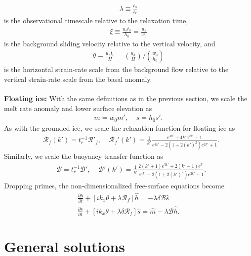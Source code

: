 \documentclass[paper=a4, fontsize=11pt]{article}
\begin{document}
\begin{align}
  \lambda \equiv  \frac{t_0}{t_r}
\end{align}
is the observational timescale relative to the relaxation time,
\begin{align}
\xi \equiv \frac{u_s t_0}{h_0} = \frac{u_s}{w_0}
\end{align}
is the background sliding velocity relative to the vertical velocity, and
\begin{align}
\theta \equiv \frac{u_h t_0}{H} = \left(\frac{u_h}{H}\right) / \left(\frac{w_0}{h_0}\right)
\end{align}
is the horizontal strain-rate scale from the background flow relative to the vertical strain-rate
scale from the basal anomaly.
\\ \\
\textbf{Floating ice:}
With the same definitions as in the previous section, we scale the melt rate anomaly
and lower surface elevation as
\begin{align}
m = w_0 m',\;\;\;\; s = h_0 s'.
\end{align}
As with the grounded ice, we scale the relaxation function for floating ice as
\begin{align}
   &\mathcal{R}_f(k') = t_r^{-1} \mathcal{R}'_f, \;\;\;\;
 \mathcal{R}_f'(k') =  \frac{1}{k'}\frac{e^{4k'} +4k' e^{2k'} -1 }{e^{4k'} -2(1+2(k')^2)e^{2k'} +1}. \label{Rfsc}
\end{align}
Similarly, we scale the buoyancy transfer function as
\begin{align}
   &\mathcal{B} =  t_r^{-1} \mathcal{B}', \;\;\;\;
 \mathcal{B}'(k') =   \frac{1}{k'}\frac{ 2(k'+1)e^{3k'}+2(k'-1)e^{k'} }{e^{4k'} -2(1+2(k')^2)e^{2k'} +1}. \label{Bsc}
\end{align}
Dropping primes, the non-dimensionalized free-surface equations become
\begin{align}
\frac{\partial \widehat{h}}{\partial t}+ \left[ik_x \theta  + \lambda \mathcal{R}_f\right]\widehat{h} = -\lambda \delta\mathcal{B}\widehat{s}\label{hfsc}\\
\frac{\partial \widehat{s}}{\partial t}+ [ik_x\theta  + \lambda\delta \mathcal{R}_f]\widehat{s} = \widehat{m} - \lambda \mathcal{B} \widehat{h}.\label{sfsc}
\end{align}

\section*{General solutions}
\end{document}
